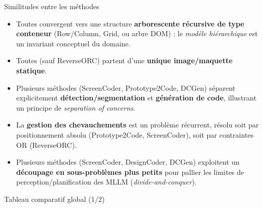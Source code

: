 \documentclass[10pt,aspectratio=169]{beamer}
\begin{document}
\begin{frame}{Similitudes entre les méthodes}
\begin{itemize}
  \item Toutes convergent vers une structure \textbf{arborescente récursive de type conteneur} (Row/Column, Grid, ou arbre DOM) : le \emph{modèle hiérarchique} est un invariant conceptuel du domaine.
  \item Toutes (sauf ReverseORC) partent d'une \textbf{unique image/maquette statique}.
  \item Plusieurs méthodes (ScreenCoder, Prototype2Code, DCGen) séparent explicitement \textbf{détection/segmentation} et \textbf{génération de code}, illustrant un principe de \emph{separation of concerns}.
  \item La \textbf{gestion des chevauchements} est un problème récurrent, résolu soit par positionnement absolu (Prototype2Code, ScreenCoder), soit par contraintes OR (ReverseORC).
  \item Plusieurs méthodes (ScreenCoder, DesignCoder, DCGen) exploitent un \textbf{découpage en sous-problèmes plus petits} pour pallier les limites de perception/planification des MLLM (\emph{divide-and-conquer}).
\end{itemize}
\end{frame}

\begin{frame}{Tableau comparatif global (1/2)}
\centering
\renewcommand{\arraystretch}{1.3}
\end{frame}
\end{document}
